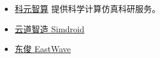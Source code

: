 
\begin{itemize}
\item \href{https://www.keyuanzhisuan.com/}{科元智算} 提供科学计算仿真科研服务。
\item \href{https://www.ibe.cn/}{云道智造 Simdroid}
\item \href{https://www.eastfdtd.com/index.aspx}{东俊 EastWave}
\end{itemize}

